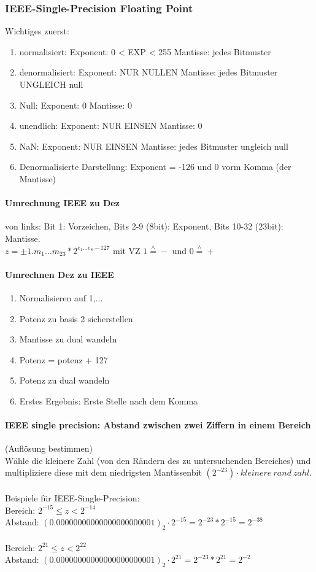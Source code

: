 \documentclass[a4paper]{article}
\begin{document}
	\subsubsection{IEEE-Single-Precision Floating Point}
		Wichtiges zuerst:
		\begin{enumerate} 
			\item normalisiert: Exponent: 0 < EXP < 255 Mantisse: jedes Bitmuster
			\item denormalisiert: Exponent: NUR NULLEN Mantisse: jedes Bitmuster UNGLEICH null
			\item Null: Exponent: 0 Mantisse: 0
			\item unendlich: Exponent: NUR EINSEN Mantisse: 0
			\item NaN: Exponent: NUR EINSEN Mantisse: jedes Bitmuster ungleich null
			\item Denormalisierte Darstellung:  Exponent = -126 und 0 vorm Komma (der Mantisse)
		\end{enumerate}
		\paragraph{Umrechnung IEEE zu Dez} 
			von links: Bit 1: Vorzeichen, Bits 2-9 (8bit): Exponent, Bits 10-32 (23bit): Mantisse.\\
			{\Large $z = \pm1.m_1 ... m_{23}*2^{e_1 ... e_8-127}$ mit VZ $1 \stackrel{\wedge}{=} - $ und $0 \stackrel{\wedge}{=} +$} 
			\\ 
		\paragraph{Umrechnen Dez zu IEEE}
			\begin{enumerate} 
				\item Normalisieren auf 1,...
				\item Potenz zu basis 2 sicherstellen
				\item Mantisse zu dual wandeln
				\item Potenz = potenz + 127
				\item Potenz zu dual wandeln
				\item Erstes Ergebnis: Erste Stelle nach dem Komma 
			\end{enumerate}
		\paragraph{IEEE single precision: Abstand zwischen zwei Ziffern in einem Bereich} (Auflösung bestimmen)
			\\Wähle die kleinere Zahl (von den Rändern des zu untersuchenden Bereiches) und multipliziere diese mit dem niedrigsten Mantissenbit $(2^{-23}) \cdot kleinere~rand~zahl$.\\
			\\Beispiele für IEEE-Single-Precision:
			\\Bereich: $2^{-15} \leq z < 2^{-14}$
			\\Abstand: $(0.00000000000000000000001)_2 \cdot 2^{-15} = 2^{-23}*2^{-15} = 2^{-38}$\\
			\\Bereich: $2^{21} \leq z < 2^{22}$
			\\Abstand: $(0.00000000000000000000001)_2 \cdot 2^{21} = 2^{-23}*2^{21} = 2^{-2}$
\end{document}
